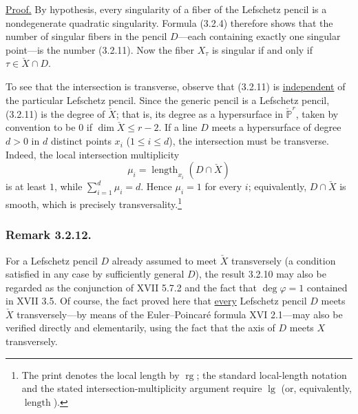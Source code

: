 \underline{Proof.}
By hypothesis, every singularity of a fiber of the Lefschetz pencil is a
nondegenerate quadratic singularity.  Formula (3.2.4) therefore shows that
the number of singular fibers in the pencil $D$---each containing exactly
one singular point---is the number (3.2.11).  Now the fiber $X_\tau$ is
singular if and only if $\tau\in\check X\cap D$.

To see that the intersection is transverse, observe that (3.2.11) is
\underline{independent} of the particular Lefschetz pencil.  Since the
generic pencil is a Lefschetz pencil, (3.2.11) is the degree of $\check X$;
that is, its degree as a hypersurface in $\check{\mathbb P}^{r}$, taken by
convention to be $0$ if $\dim\check X\le r-2$.  If a line $D$ meets a
hypersurface of degree $d>0$ in $d$ distinct points $x_i$
($1\le i\le d$), the intersection must be transverse.  Indeed, the local
intersection multiplicity
\[
\mu_i=\operatorname{length}_{x_i}(D\cap\check X)
\]
is at least $1$, while $\sum_{i=1}^d\mu_i=d$.  Hence $\mu_i=1$ for every
$i$; equivalently, $D\cap\check X$ is smooth, which is precisely
transversality.\footnote{The print denotes the local length by
$\operatorname{rg}$; the standard local-length notation and the stated
intersection-multiplicity argument require $\operatorname{lg}$ (or,
equivalently, $\operatorname{length}$).}

\subsubsection*{Remark 3.2.12.}
For a Lefschetz pencil $D$ already assumed to meet $\check X$ transversely
(a condition satisfied in any case by sufficiently general $D$), the
result 3.2.10 may also be regarded as the conjunction of XVII 5.7.2 and
the fact that $\deg\varphi=1$ contained in XVII 3.5.  Of course, the fact
proved here that \underline{every} Lefschetz pencil $D$ meets $\check X$
transversely---by means of the Euler--Poincar\'e formula XVI 2.1---may also
be verified directly and elementarily, using the fact that the axis of
$D$ meets $X$ transversely.
